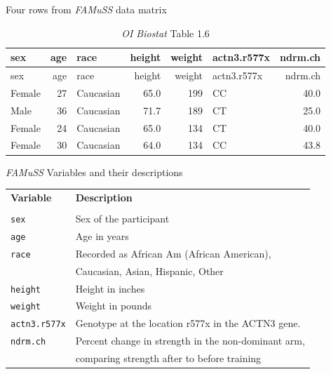 \documentclass[
  ignorenonframetext,
]{beamer}
\begin{document}
\begin{frame}{Four rows from \emph{FAMuSS} data matrix}
\protect\hypertarget{four-rows-from-famuss-data-matrix}{}

\captionsetup[table]{labelformat=empty}

\scriptsize

\normalsize

\scriptsize

\begin{longtable}[]{@{}lrlrrlr@{}}
\caption{\emph{OI Biostat} Table 1.6}\tabularnewline
\toprule
sex & age & race & height & weight & actn3.r577x &
ndrm.ch\tabularnewline
\midrule
\endfirsthead
\toprule
sex & age & race & height & weight & actn3.r577x &
ndrm.ch\tabularnewline
\midrule
\endhead
Female & 27 & Caucasian & 65.0 & 199 & CC & 40.0\tabularnewline
Male & 36 & Caucasian & 71.7 & 189 & CT & 25.0\tabularnewline
Female & 24 & Caucasian & 65.0 & 134 & CT & 40.0\tabularnewline
Female & 30 & Caucasian & 64.0 & 134 & CC & 43.8\tabularnewline
\bottomrule
\end{longtable}

\normalsize

\end{frame}

\begin{frame}{\emph{FAMuSS} Variables and their descriptions}
\protect\hypertarget{famuss-variables-and-their-descriptions}{}

\begin{center}
    \begin{tabular}{ll}
        {\bf Variable} & {\bf Description} \\
        & \\
        \texttt{sex} & Sex of the participant \\
        \texttt{age} & Age in years   \\
        \texttt{race} & Recorded as African Am (African American),\\
           & Caucasian, Asian, Hispanic, Other \\
        \texttt{height} & Height in inches    \\
        \texttt{weight} & Weight in pounds  \\
        \texttt{actn3.r577x} & Genotype at the location r577x in the ACTN3 gene. \\
        \texttt{ndrm.ch} & Percent change in strength in the non-dominant arm, \\
          & comparing strength after to before training \\
    \end{tabular}
\end{center}

\end{frame}
\end{document}
